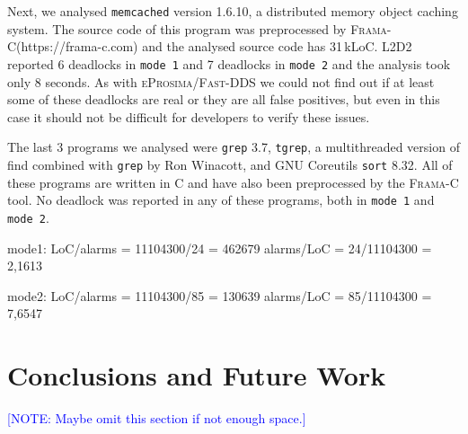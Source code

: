 \documentclass[runningheads]{llncs}
\newcommand{\rem}[1]{\textcolor{blue}{[NOTE: #1]}}
\newcommand{\LLDD}{\textsc{L2D2}\xspace} %
\newcommand{\grep}{\texttt{grep}\xspace}
\newcommand{\sort}{\texttt{sort}\xspace}
\newcommand{\tgrep}{\texttt{tgrep}\xspace}
\newcommand{\memcached}{\texttt{memcached}\xspace}
\newcommand{\eprosimaDDS}{\textsc{eProsima/Fast-DDS}\xspace}
\newcommand{\framac}{\textsc{Frama-C}\xspace}
\newcommand{\mOne}{\texttt{mode\,1}\xspace}
\newcommand{\mTwo}{\texttt{mode\,2}\xspace}
\begin{document}
Next, we analysed \memcached version 1.6.10, a distributed memory object caching system. The source code of this program was preprocessed by \framac (https://frama-c.com) and the analysed source code has 31\,kLoC. \LLDD reported 6 deadlocks in \mOne and 7 deadlocks in \mTwo and the analysis took only 8 seconds. As with \eprosimaDDS we could not find out if at least some of these deadlocks are real or they are all false positives, but even in this case it should not be difficult for developers to verify these issues.

The last 3 programs we analysed were \grep 3.7, \tgrep, a multithreaded version of find combined with \grep by Ron Winacott, and GNU Coreutils \sort 8.32. All of these programs are written in C and have also been preprocessed by the \framac tool. No deadlock was reported in any of these programs, both in \mOne and \mTwo .


mode1:
LoC/alarms = 11104300/24 = 462679
alarms/LoC = 24/11104300 = 2,1613

mode2:
LoC/alarms = 11104300/85 = 130639
alarms/LoC = 85/11104300 = 7,6547

\enlargethispage{4mm}

\vspace*{-4mm}\section{Conclusions and Future Work}\vspace*{-2mm}
\label{sec:con}

\rem{Maybe omit this section if not enough space.}


\vspace*{-4mm}
\renewcommand\refname{References\vspace*{-2mm}}



\enlargethispage{4mm}

\end{document}
